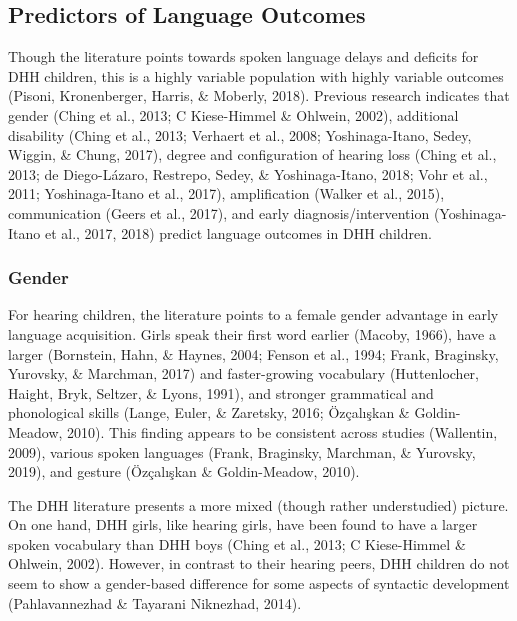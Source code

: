 \documentclass[english,man]{apa6}
\begin{document}
\hypertarget{predictors-of-language-outcomes}{%
\subsection{Predictors of Language Outcomes}\label{predictors-of-language-outcomes}}

Though the literature points towards spoken language delays and deficits for DHH children, this is a highly variable population with highly variable outcomes (Pisoni, Kronenberger, Harris, \& Moberly, 2018). Previous research indicates that gender (Ching et al., 2013; C Kiese-Himmel \& Ohlwein, 2002), additional disability (Ching et al., 2013; Verhaert et al., 2008; Yoshinaga-Itano, Sedey, Wiggin, \& Chung, 2017), degree and configuration of hearing loss (Ching et al., 2013; de Diego-Lázaro, Restrepo, Sedey, \& Yoshinaga-Itano, 2018; Vohr et al., 2011; Yoshinaga-Itano et al., 2017), amplification (Walker et al., 2015), communication (Geers et al., 2017), and early diagnosis/intervention (Yoshinaga-Itano et al., 2017, 2018) predict language outcomes in DHH children.

\hypertarget{gender}{%
\subsubsection{Gender}\label{gender}}

For hearing children, the literature points to a female gender advantage in early language acquisition. Girls speak their first word earlier (Macoby, 1966), have a larger (Bornstein, Hahn, \& Haynes, 2004; Fenson et al., 1994; Frank, Braginsky, Yurovsky, \& Marchman, 2017) and faster-growing vocabulary (Huttenlocher, Haight, Bryk, Seltzer, \& Lyons, 1991), and stronger grammatical and phonological skills (Lange, Euler, \& Zaretsky, 2016; Özçalışkan \& Goldin-Meadow, 2010). This finding appears to be consistent across studies (Wallentin, 2009), various spoken languages (Frank, Braginsky, Marchman, \& Yurovsky, 2019), and gesture (Özçalışkan \& Goldin-Meadow, 2010).

The DHH literature presents a more mixed (though rather understudied) picture. On one hand, DHH girls, like hearing girls, have been found to have a larger spoken vocabulary than DHH boys (Ching et al., 2013; C Kiese-Himmel \& Ohlwein, 2002). However, in contrast to their hearing peers, DHH children do not seem to show a gender-based difference for some aspects of syntactic development (Pahlavannezhad \& Tayarani Niknezhad, 2014).
\end{document}
